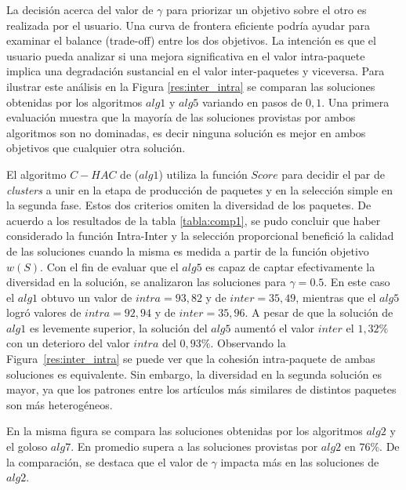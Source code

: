 La decisión acerca del valor de $\gamma$ para priorizar un objetivo sobre el otro es realizada por el usuario. Una curva de frontera eficiente podría ayudar para examinar el balance (trade-off) entre los dos objetivos. La intención es que el usuario pueda analizar si una mejora significativa en el valor intra-paquete implica una degradación sustancial en el valor inter-paquetes y viceversa. Para ilustrar este análisis en la Figura \ref{res:inter_intra} se comparan las soluciones obtenidas por los algoritmos $alg1$ y $alg5$ variando en pasos de $0,1$. Una primera evaluación muestra que la mayoría de las soluciones provistas por ambos algoritmos son no dominadas, es decir ninguna solución es mejor en ambos objetivos que cualquier otra solución.

El algoritmo $C-HAC$ de \cite{journals/tkde/Amer-YahiaBCFMZ14} ($alg1$) utiliza la función $Score$ para decidir el par de {\em clusters} a unir en la etapa de producción de paquetes y en la selección simple en la segunda fase. Estos dos criterios omiten la diversidad de los paquetes. De acuerdo a los resultados de la tabla \ref{tabla:comp1}, se pudo concluir que haber considerado la función Intra-Inter y la selección proporcional benefició la calidad de las soluciones cuando la misma es medida a partir de la función objetivo $w(S)$. Con el fin de evaluar que el $alg5$ es capaz de captar efectivamente la diversidad en la solución, se analizaron las soluciones para $\gamma=0.5$. En este caso el $alg1$ obtuvo un valor de $intra=93,82$ y de $inter=35,49$, mientras que el $alg5$ logró valores de $intra=92,94$ y de $inter=35,96$. A pesar de que la solución de $alg1$ es levemente superior, la solución del $alg5$ aumentó el valor $inter$ el $1,32\%$ con un deterioro del valor $intra$ del $0,93\%$. Observando la Figura~\ref{res:inter_intra} se puede ver que la cohesión intra-paquete de ambas soluciones es equivalente. Sin embargo, la diversidad en la segunda solución es mayor, ya que los patrones entre los artículos más similares de distintos paquetes son más heterogéneos. 

En la misma figura se compara las soluciones obtenidas por los algoritmos $alg2$ y el goloso $alg7$. En promedio supera a las soluciones provistas por $alg2$ en $76\%$. De la comparación, se destaca que el valor de $\gamma$ impacta más en las soluciones de $alg2$.  

